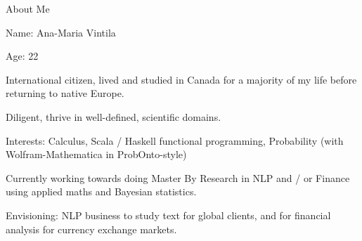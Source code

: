 


\begin{frame}{About Me}

\begin{itemizeSpaced}{10pt}
    \item Name: Ana-Maria Vintila
    \item Age: 22
    \item International citizen, lived and studied in Canada for a majority of my life before returning to native Europe. 
    \item Diligent, thrive in well-defined, scientific domains. 
    
    \item Interests: Calculus, Scala / Haskell functional programming, Probability (with Wolfram-Mathematica in ProbOnto-style)
    
    \item Currently working towards doing Master By Research in NLP and / or Finance using applied maths and Bayesian statistics. 
    
    \item Envisioning: NLP business to study text for global clients, and for financial analysis for currency exchange markets. 
    
\end{itemizeSpaced}

    
\end{frame}